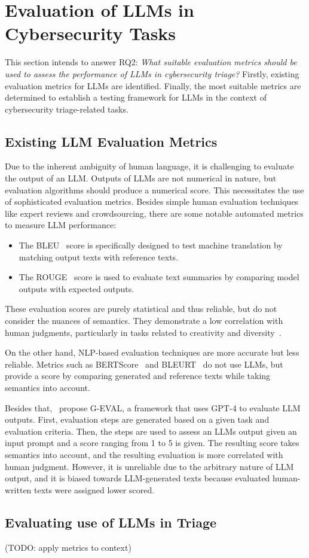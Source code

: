 \section{Evaluation of LLMs in Cybersecurity Tasks}
\label{sec:rq2}

This section intends to answer RQ2:
\textit{What suitable evaluation metrics should be used to assess the performance of LLMs in cybersecurity triage?}
Firstly, existing evaluation metrics for LLMs are identified.
Finally, the most suitable metrics are determined to establish a testing framework for LLMs in the context of
cybersecurity triage-related tasks.

\subsection{Existing LLM Evaluation Metrics}
\label{subsec:rq2-existing-metrics}

Due to the inherent ambiguity of human language, it is challenging to evaluate the output of an LLM\@.
Outputs of LLMs are not numerical in nature, but evaluation algorithms should produce a numerical score.
This necessitates the use of sophisticated evaluation metrics.
Besides simple human evaluation techniques like expert reviews and crowdsourcing, there are some notable automated
metrics to measure LLM performance:
\begin{itemize}
    \item The BLEU\ \citep{papineni2002bleu} score is specifically designed to test machine translation by matching
    output texts with reference texts.
    \item The ROUGE\ \citep{lin2004rouge} score is used to evaluate text summaries by comparing model outputs with
    expected outputs.
\end{itemize}
These evaluation scores are purely statistical and thus reliable, but do not consider the nuances of semantics.
They demonstrate a low correlation with human judgments, particularly in tasks related to creativity and
diversity\ \citep{liu2023gpteval}.

On the other hand, NLP-based evaluation techniques are more accurate but less reliable.
Metrics such as BERTScore\ \citep{zhang2019bertscore} and BLEURT\ \citep{sellam2020bleurt} do not use LLMs, but provide
a score by comparing generated and reference texts while taking semantics into account.

Besides that,\ \citet{liu2023gpteval} propose G-EVAL, a framework that uses GPT-4 to evaluate LLM outputs.
First, evaluation steps are generated based on a given task and evaluation criteria.
Then, the steps are used to assess an LLMs output given an input prompt and a score ranging from 1 to 5 is given.
The resulting score takes semantics into account, and the resulting evaluation is more correlated with human judgment.
However, it is unreliable due to the arbitrary nature of LLM output, and it is biased towards LLM-generated texts
because evaluated human-written texts were assigned lower scored.

\subsection{Evaluating use of LLMs in Triage}
\label{subsec:rq2-evaluating-triage}

(TODO: apply metrics to context) %